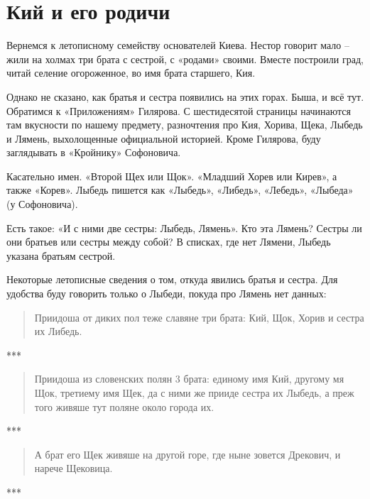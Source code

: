 \chapter{Кий и его родичи}

Вернемся к летописному семейству основателей Киева. Нестор говорит мало – жили на холмах три брата с сестрой, с «родами» своими. Вместе построили град, читай селение огороженное, во имя брата старшего, Кия.

Однако не сказано, как братья и сестра появились на этих горах. Быша, и всё тут. Обратимся к «Приложениям» Гилярова. С шестидесятой страницы начинаются там вкусности по нашему предмету, разночтения про Кия, Хорива, Щека, Лыбедь и Лямень, выхолощенные официальной историей. Кроме Гилярова, буду заглядывать в «Кройнику» Софоновича\cite{sofonovich01}.

Касательно имен. «Второй Щех или Щок». «Младший Хорев или Кирев», а также «Корев». Лыбедь пишется как «Лыбедь», «Либедь», «Лебедь», «Лыбеда» (у Софоновича). 

Есть такое: «И с ними две сестры: Лыбедь, Лямень». Кто эта Лямень? Сестры ли они братьев или сестры между собой? В списках, где нет Лямени, Лыбедь указана братьям сестрой.

Некоторые летописные сведения о том, откуда явились братья и сестра. Для удобства буду говорить только о Лыбеди, покуда про Лямень нет данных:

\begin{quotation}
Приидоша от диких пол теже славяне три брата: Кий, Щок, Хорив и сестра их Либедь.
\end{quotation}

\begin{center}***\end{center}

\begin{quotation}
Приидоша из словенских полян 3 брата: единому имя Кий, другому мя Щок, третиему имя Щек, да с ними же прииде сестра их Лыбедь, а преж того живяше тут поляне около города их.
\end{quotation}

\begin{center}***\end{center}

\begin{quotation}
А брат его Щек живяше на другой горе, где ныне зовется Дрекович, и нарече Щековица.
\end{quotation}

\begin{center}***\end{center}

